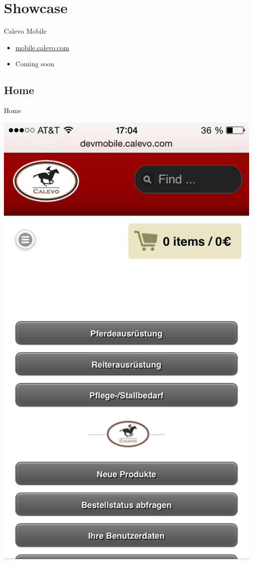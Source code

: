 \section{Showcase}

\begin{frame}{Calevo Mobile}
\begin{itemize}
\item \url{mobile.calevo.com}
\item Coming soon
\end{itemize}
\end{frame}

\subsection{Home}
\begin{frame}[plain]{Home}
\begin{center}
  \includegraphics[width=\textwidth,height=1\textheight,keepaspectratio]{pics/home.png}
\end{center}
\end{frame}

